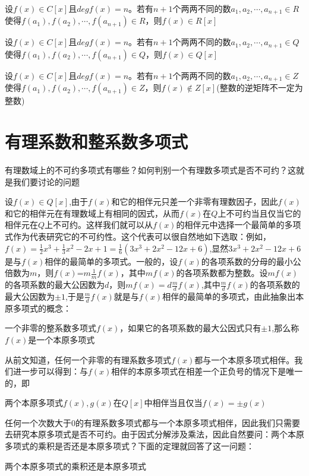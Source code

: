 \documentclass[lang=cn,10pt]{elegantbook}
\begin{document}
\begin{remark}
	
	设$f(x)\in C[x]且deg{f}(x)=n$。若有$n+1$个两两不同的数$a_1,a_2,\cdots,a_{n+1}\in R$使得$f(a_1),f(a_2),\cdots,f(a_{n+1})\in R$，则$f(x)\in R[x]$
	
	设$f(x)\in C[x]$且$deg{f}(x)=n$。若有$n+1$个两两不同的数$a_1,a_2,\cdots,a_{n+1}\in Q$使得$f(a_1),f(a_2),\cdots,f(a_{n+1})\in Q$，则$f(x)\in Q[x]$
	
	设$f(x)\in C[x]$且$deg{f}(x)=n$。若有$n+1$个两两不同的数$a_1,a_2,\cdots,a_{n+1}\in Z$使得$f(a_1),f(a_2),\cdots,f(a_{n+1})\in Z$，则$f(x)\notin Z[x]$(整数的逆矩阵不一定为整数)
\end{remark}
\section{有理系数和整系数多项式}
有理数域上的不可约多项式有哪些？如何判别一个有理数多项式是否不可约？这就是我们要讨论的问题

设$f(x)\in Q[x]$,由于$f(x)$和它的相伴元只差一个非零有理数因子，因此$f(x)$和它的相伴元在有理数域上有相同的因式，从而$f(x) $在$Q$上不可约当且仅当它的相伴元在$Q$上不可约。这样我们就可以从$f(x)$的相伴元中选择一个最简单的多项式作为代表研究它的不可约性。这个代表可以很自然地如下选取：例如，$f(x)=\frac{1}{2}x^{3}+\frac{1}{3}x^{2}-2x+1=\frac{1}{6}(3x^{3}+2x^{2}-12x+6)$,显然$3x^{3}+2x^{2}-12x+6$是与$f(x)$相伴的最简单的多项式。一般的，设$f(x)$的各项系数的分母的最小公倍数为$m$，则$f(x)$=$m\frac{1}{m}f(x)$，其中$mf(x)$的各项系数都为整数。设$mf(x)$的各项系数的最大公因数为$d$，则$mf(x)=d\frac{m}{d}f(x)$,其中$\frac{m}{d}f(x)$的各项系数的最大公因数为$\pm1$,于是$\frac{m}{d}f(x)$就是与$f(x)$相伴的最简单的多项式，由此抽象出本原多项式的概念：
\begin{definition}[本原多项式]
	一个非零的整系数多项式$f(x)$，如果它的各项系数的最大公因式只有$\pm1$,那么称$f(x)$是一个本原多项式
\end{definition}
从前文知道，任何一个非零的有理系数多项式$f(x)$都与一个本原多项式相伴。我们进一步可以得到：与$f(x)$相伴的本原多项式在相差一个正负号的情况下是唯一的，即
\begin{theorem}
	两个本原多项式$f(x),g(x)$在$Q[x]$中相伴当且仅当$f(x)=\pm g(x)$
\end{theorem}

任何一个次数大于0的有理系数多项式都与一个本原多项式相伴，因此我们只需要去研究本原多项式是否不可约。由于因式分解涉及乘法，因此自然要问：两个本原多项式的乘积是否还是本原多项式？下面的定理就回答了这一问题：
\begin{theorem}
	两个本原多项式的乘积还是本原多项式
\end{theorem}
\end{document}
